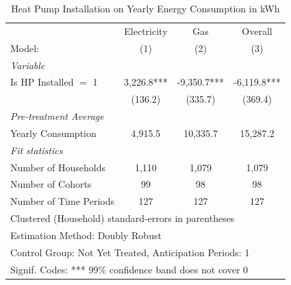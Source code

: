 \begin{table}[htbp]
   \caption{\label{tab:hp-did-cs-gas-only} Heat Pump Installation on Yearly Energy Consumption in kWh}
   \centering
   \begin{tabular}{lccc}
      \tabularnewline \midrule \midrule
                                     & Electricity     & Gas     & Overall \\   
      Model:                         & (1)              & (2)              & (3)\\  
      \midrule
      \emph{Variable}\\
      Is HP Installed $=$ 1          & 3,226.8*** & -9,350.7*** & -6,119.8***\\   
                                     & (136.2)         & (335.7)         & (369.4)\\   
      \midrule
      \emph{Pre-treatment Average}\\
      Yearly Consumption              & 4,915.5 & 10,335.7 & 15,287.2\\   
      \midrule
      \emph{Fit statistics}\\
      Number of Households                   & 1,110           & 1,079           & 1,079\\  
      Number of Cohorts              & 99              & 98              & 98\\  
      Number of Time Periods         & 127             & 127             & 127\\  
      \midrule \midrule
      \multicolumn{4}{l}{Clustered (Household) standard-errors in parentheses}\\
      \multicolumn{4}{l}{Estimation Method: Doubly Robust}\\
      \multicolumn{4}{l}{Control Group: Not Yet Treated, Anticipation Periods: 1}\\
      \multicolumn{4}{l}{Signif. Codes: *** 99\% confidence band does not cover 0}\\
   \end{tabular}
\end{table}

